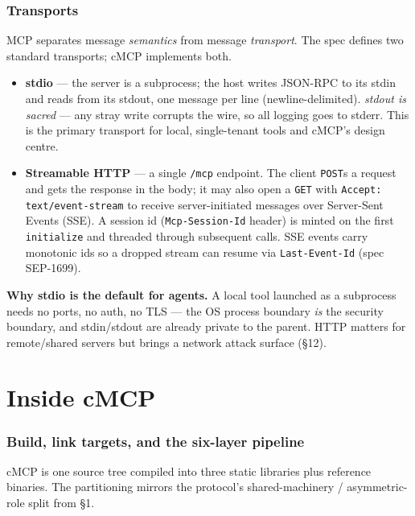 \documentclass[10pt]{article}
\newcommand{\code}[1]{\texttt{\small #1}}
\begin{document}
\section{Transports}

MCP separates message \emph{semantics} from message \emph{transport}. The spec
defines two standard transports; cMCP implements both.

\begin{itemize}
  \item \textbf{stdio} --- the server is a subprocess; the host writes JSON-RPC to
    its stdin and reads from its stdout, one message per line (newline-delimited).
    \emph{stdout is sacred} --- any stray write corrupts the wire, so all logging
    goes to stderr. This is the primary transport for local, single-tenant tools
    and cMCP's design centre.
  \item \textbf{Streamable HTTP} --- a single \code{/mcp} endpoint. The client
    \code{POST}s a request and gets the response in the body; it may also open a
    \code{GET} with \code{Accept: text/event-stream} to receive server-initiated
    messages over Server-Sent Events (SSE). A session id (\code{Mcp-Session-Id}
    header) is minted on the first \code{initialize} and threaded through
    subsequent calls. SSE events carry monotonic ids so a dropped stream can
    resume via \code{Last-Event-Id} (spec SEP-1699).
\end{itemize}

\textbf{Why stdio is the default for agents.} A local tool launched as a
subprocess needs no ports, no auth, no TLS --- the OS process boundary \emph{is}
the security boundary, and stdin/stdout are already private to the parent. HTTP
matters for remote/shared servers but brings a network attack surface (\S12).

\part{Inside cMCP}

\section{Build, link targets, and the six-layer pipeline}

cMCP is one source tree compiled into three static libraries plus reference
binaries. The partitioning mirrors the protocol's shared-machinery /
asymmetric-role split from \S1.
\end{document}
